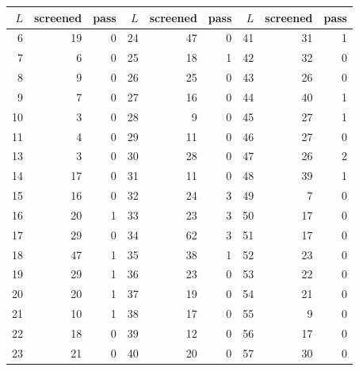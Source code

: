\begin{tabular}{rrrrrrrrr}\toprule
$L$ & screened & pass & $L$ & screened & pass & $L$ & screened & pass\\\midrule
6 & 19 & 0 & 24 & 47 & 0 & 41 & 31 & 1\\
7 & 6 & 0 & 25 & 18 & 1 & 42 & 32 & 0\\
8 & 9 & 0 & 26 & 25 & 0 & 43 & 26 & 0\\
9 & 7 & 0 & 27 & 16 & 0 & 44 & 40 & 1\\
10 & 3 & 0 & 28 & 9 & 0 & 45 & 27 & 1\\
11 & 4 & 0 & 29 & 11 & 0 & 46 & 27 & 0\\
13 & 3 & 0 & 30 & 28 & 0 & 47 & 26 & 2\\
14 & 17 & 0 & 31 & 11 & 0 & 48 & 39 & 1\\
15 & 16 & 0 & 32 & 24 & 3 & 49 & 7 & 0\\
16 & 20 & 1 & 33 & 23 & 3 & 50 & 17 & 0\\
17 & 29 & 0 & 34 & 62 & 3 & 51 & 17 & 0\\
18 & 47 & 1 & 35 & 38 & 1 & 52 & 23 & 0\\
19 & 29 & 1 & 36 & 23 & 0 & 53 & 22 & 0\\
20 & 20 & 1 & 37 & 19 & 0 & 54 & 21 & 0\\
21 & 10 & 1 & 38 & 17 & 0 & 55 & 9 & 0\\
22 & 18 & 0 & 39 & 12 & 0 & 56 & 17 & 0\\
23 & 21 & 0 & 40 & 20 & 0 & 57 & 30 & 0\\
\bottomrule\end{tabular}
